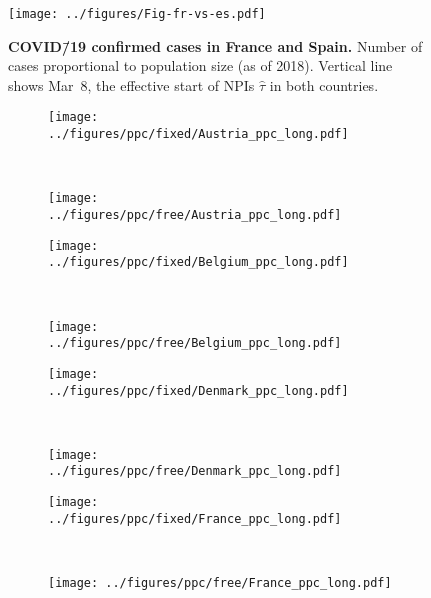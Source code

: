 \documentclass[12pt]{extarticle}
\newcommand{\covid}{COVID\=/19 }
\begin{document}
\begin{figure}[h]
    \centering
	\texttt{[image: ../figures/Fig-fr-vs-es.pdf]}
    \caption{
    \textbf{\covid confirmed cases in France and Spain.}
    Number of cases proportional to population size (as of 2018). 
    Vertical line shows Mar~8, the effective start of NPIs $\hat{\tau}$ in both countries.
    } 
    \label{fig:fig-fr-vs-es}
\end{figure}
 


\begin{figure}[h]	
    \centering
    \begin{subfigure}{0.45\textwidth}
        \texttt{[image: ../figures/ppc/fixed/Austria\_ppc\_long.pdf]}
    \end{subfigure}
    \label{fig:ppc}
    ~
    \begin{subfigure}{0.45\textwidth}
        \texttt{[image: ../figures/ppc/free/Austria\_ppc\_long.pdf]}
    \end{subfigure}
    \begin{subfigure}{0.45\textwidth}
        \texttt{[image: ../figures/ppc/fixed/Belgium\_ppc\_long.pdf]}
    \end{subfigure}
    ~
    \begin{subfigure}{0.45\textwidth}
        \texttt{[image: ../figures/ppc/free/Belgium\_ppc\_long.pdf]}
    \end{subfigure}
     \begin{subfigure}{0.45\textwidth}
        \texttt{[image: ../figures/ppc/fixed/Denmark\_ppc\_long.pdf]}
    \end{subfigure}
    ~
    \begin{subfigure}{0.45\textwidth}
        \texttt{[image: ../figures/ppc/free/Denmark\_ppc\_long.pdf]}
    \end{subfigure}
    \begin{subfigure}{0.45\textwidth}
        \texttt{[image: ../figures/ppc/fixed/France\_ppc\_long.pdf]}
    \end{subfigure}
    ~
    \begin{subfigure}{0.45\textwidth}
        \texttt{[image: ../figures/ppc/free/France\_ppc\_long.pdf]}
    \end{subfigure}
\end{figure}
\end{document}
